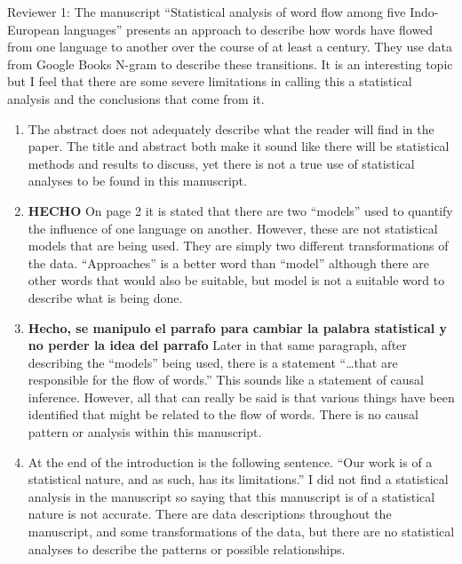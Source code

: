 \documentclass{article}
\begin{document}
	
	
	Reviewer 1: The manuscript “Statistical analysis of word flow among
five Indo-European languages” presents an approach to describe how
words have flowed from one language to another over the course of at
least a century. They use data from Google Books N-gram to describe
these transitions. It is an interesting topic but I feel that there
are some severe limitations in calling this a statistical analysis and
the conclusions that come from it.

	\begin{enumerate}
		
		\item The abstract does not adequately describe what the reader will find
		in the paper. The title and abstract both make it sound like there
		will be statistical methods and results to discuss, yet there is not a
		true use of statistical analyses to be found in this manuscript.
		
		\item \textbf{HECHO} On page 2 it is stated that there are two “models” used to quantify
		the influence of one language on another. However, these are not
		statistical models that are being used. They are simply two different
		transformations of the data. “Approaches” is a better word than
		“model” although there are other words that would also be suitable,
		but model is not a suitable word to describe what is being done.
		
		
		\item \textbf{Hecho, se manipulo el parrafo para cambiar la palabra statistical y no perder la idea del parrafo} Later in that same paragraph, after describing the “models” being
		used, there is a statement “…that are responsible for the flow of
		words.” This sounds like a statement of causal inference. However, all
		that can really be said is that various things have been identified
		that might be related to the flow of words. There is no causal pattern
		or analysis within this manuscript.
		
		\item  At the end of the introduction is the following sentence. “Our work
		is of a statistical nature, and as such, has its limitations.” I did
		not find a statistical analysis in the manuscript so saying that this
		manuscript is of a statistical nature is not accurate. There are data
		descriptions throughout the manuscript, and some transformations of
		the data, but there are no statistical analyses to describe the
		patterns or possible relationships.
		

\end{enumerate}
\end{document}

